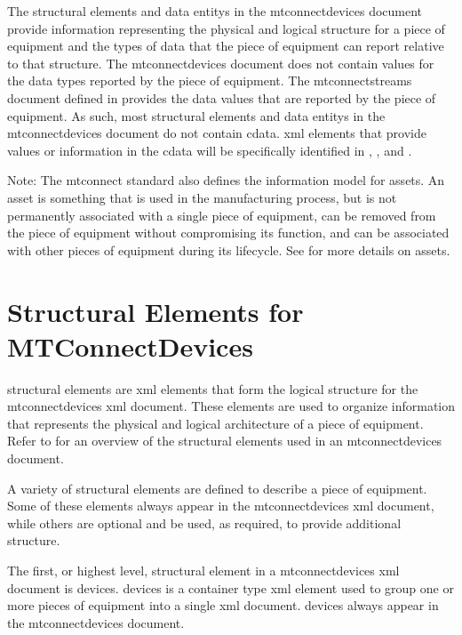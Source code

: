 The \glspl{structural element} and \glspl{data entity} in the \gls{mtconnectdevices} document provide information representing the physical and logical structure for a piece of equipment and the types of data that the piece of equipment can report relative to that structure.   The \gls{mtconnectdevices} document does not contain values for the data types reported by the piece of equipment.  The \gls{mtconnectstreams} document defined in  provides the data values that are reported by the piece of equipment.   As such, most \glspl{structural element} and \glspl{data entity} in the \gls{mtconnectdevices} document do not contain \gls{cdata}.  \gls{xml} elements that provide values or information in the \gls{cdata} will be specifically identified in , , and .

\begin{note}
Note:  The \gls{mtconnect standard} also defines the information model for \glspl{asset}.  An \gls{asset} is something that is used in the manufacturing process, but is not permanently associated with a single piece of equipment, can be removed from the piece of equipment without compromising its function, and can be associated with other pieces of equipment during its lifecycle.  See  for more details on \glspl{asset}.

\end{note}
\section{Structural Elements for MTConnectDevices}
\label{sec:Structural Elements for MTConnectDevices}
\glspl{structural element} are \gls{xml} elements that form the logical structure for the \gls{mtconnectdevices} \gls{xml} document.  These elements are used to organize information that represents the physical and logical architecture of a piece of equipment.  Refer to  for an overview of the \glspl{structural element} used in an \gls{mtconnectdevices} document.

A variety of \glspl{structural element} are defined to describe a piece of equipment.  Some of these elements \MUST always appear in the \gls{mtconnectdevices} \gls{xml} document, while others are optional and \may be used, as required, to provide additional structure.

The first, or highest level, \gls{structural element} in a \gls{mtconnectdevices} \gls{xml} document is \gls{devices}. \gls{devices} is a container type \gls{xml} element used to group one or more pieces of equipment into a single \gls{xml} document.  \gls{devices} \MUST always appear in the \gls{mtconnectdevices} document.

